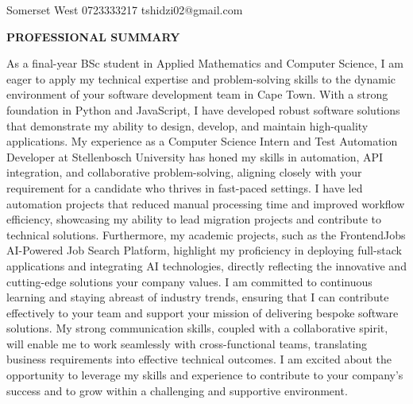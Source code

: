 \documentclass[11pt, a4paper]{article}
\newcommand{\cvsection}[1]{%
  \vspace{6pt}%
  \noindent%
  \colorbox{DKGreen}{\hspace{4pt}\rule{0pt}{14pt}\hspace{4pt}}%
  \colorbox{CardBG}{%
    \parbox[c][14pt]{\dimexpr\linewidth-16pt\relax}{%
      \hspace{8pt}\textcolor{DKGreen}{\textbf{\large\MakeUppercase{#1}}}%
    }%
  }%
  \par
  \noindent{\color{BorderClr}\rule{\linewidth}{0.6pt}}%
  \vspace{4pt}\par\noindent%
}
\begin{document}
\noindent\hspace{-6mm}%
\colorbox{HeaderBG}{%
  \begin{minipage}{\dimexpr\linewidth+12mm\relax}%
  \begin{center}
    \vspace{5mm}%
    \par\vspace{2mm}%
    \par\vspace{3mm}%
    \hspace{5mm}%
    \textcolor{HeaderContact}{Somerset West}\;%
    \textcolor{HeaderSep}{\vert}\;%
    \textcolor{HeaderContact}{0723333217}\;%
    \textcolor{HeaderSep}{\vert}\;%
    \textcolor{HeaderContact}{tshidzi02@gmail.com}%
    \par\vspace{5mm}%
    \end{center}
  \end{minipage}%
}

\vspace{4mm}

\cvsection{Professional Summary}
\vspace{4pt}
\noindent\textcolor{MidTxt}{As a final-year BSc student in Applied Mathematics and Computer Science, I am eager to apply my technical expertise and problem-solving skills to the dynamic environment of your software development team in Cape Town. With a strong foundation in Python and JavaScript, I have developed robust software solutions that demonstrate my ability to design, develop, and maintain high-quality applications. My experience as a Computer Science Intern and Test Automation Developer at Stellenbosch University has honed my skills in automation, API integration, and collaborative problem-solving, aligning closely with your requirement for a candidate who thrives in fast-paced settings. I have led automation projects that reduced manual processing time and improved workflow efficiency, showcasing my ability to lead migration projects and contribute to technical solutions. Furthermore, my academic projects, such as the FrontendJobs AI-Powered Job Search Platform, highlight my proficiency in deploying full-stack applications and integrating AI technologies, directly reflecting the innovative and cutting-edge solutions your company values. I am committed to continuous learning and staying abreast of industry trends, ensuring that I can contribute effectively to your team and support your mission of delivering bespoke software solutions. My strong communication skills, coupled with a collaborative spirit, will enable me to work seamlessly with cross-functional teams, translating business requirements into effective technical outcomes. I am excited about the opportunity to leverage my skills and experience to contribute to your company's success and to grow within a challenging and supportive environment.}
\end{document}
